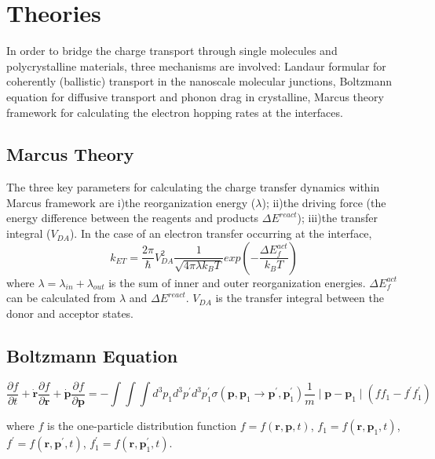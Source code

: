 \documentclass[prb,showpacs,10pt,superscriptaddress]{revtex4-1}
\begin{document}
\section{Theories}
In order to bridge the charge transport through single molecules and polycrystalline materials, three mechanisms are involved: Landaur formular for coherently (ballistic) transport in the nanoscale molecular junctions, Boltzmann equation for diffusive transport and phonon drag in crystalline, Marcus theory framework for calculating the electron hopping rates at the interfaces. 
\subsection{Marcus Theory}
The three key parameters for calculating the charge transfer dynamics within Marcus framework are i)the reorganization energy ($\lambda$); ii)the driving force (the energy difference between the reagents and products $\Delta E^{react}$); iii)the transfer integral ($V_{DA}$)\cite{DFT calculations for tranfer intergral}. 
In the case of an electron transfer occurring at the interface,
\begin{equation}
 k_{ET} = \dfrac{2\pi}{\hbar}V_{DA}^2 \dfrac{1}{\sqrt{4\pi\lambda k_{B}T}}exp(-\dfrac{\Delta E_{f}^{act}}{k_{B}T})
\end{equation}
where $\lambda = \lambda_{in} + \lambda_{out}$ is the sum of inner and outer reorganization energies. $\Delta E_{f}^{act}$ can be calculated from $\lambda$ and $\Delta E^{react}$. $V_{DA}$ is the transfer integral between the donor and acceptor states.

\subsection{Boltzmann Equation}
\begin{equation}
\frac{\partial f}{\partial t} + \dot{\textbf{r}}\frac{\partial f}{\partial \textbf{r}} + \dot{\textbf{p}}\frac{\partial f}{\partial \textbf{p}} = - \int\int\int d^3 p_{1}d^3p^{\prime}d^3p_{1}^{\prime} \sigma(\textbf{p},\textbf{p}_{1} 
\longrightarrow \textbf{p}^{\prime},\textbf{p}_{1}^{\prime}) \dfrac{1}{m} \mid \textbf{p}-\textbf{p}_{1} \mid (ff_{1}-f^{\prime}f_{1}^{\prime})
\end{equation}


where $f$ is the one-particle distribution function $f=f(\textbf{r},\textbf{p},t)$, $f_1=f(\textbf{r},\textbf{p}_{1},t)$,  $f^{\prime}=f(\textbf{r},\textbf{p}^{\prime},t)$, $f_{1}^{\prime}=f(\textbf{r},\textbf{p}_{1}^{\prime},t)$.
\
\end{document}
